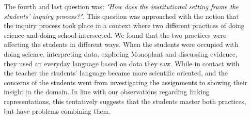 The fourth and last question was: \emph{"How does the institutional setting frame the students' inquiry process?"}. This question was approached with the notion that the inquiry process took place in a context where two different practices of doing science and doing school intersected. We found that the two practices were affecting the students in different ways. When the students were occupied with doing science, interpreting data, exploring Monoplant and discussing evidence, they used an everyday language based on data they saw. While in contact with the teacher the students' language became more scientific oriented, and the concerns of the students went from investigating the assignments to showing their insight in the domain. In line with our observations regarding linking representations, this tentatively suggests that the students master both practices, but have problems combining them.










